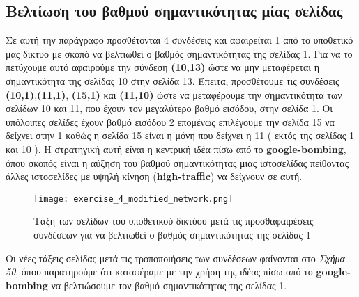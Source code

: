 \documentclass[First Project.tex]{subfiles}
\begin{document}
\subsection{ Βελτίωση του βαθμού σημαντικότητας μίας σελίδας }

Σε αυτή την παράγραφο προσθέτονται 4 συνδέσεις και αφαιρείται 1 από το υποθετικό μας δίκτυο με σκοπό να βελτιωθεί ο βαθμός σημαντικότητας της
σελίδας 1. Για να το πετύχουμε αυτό αφαιρούμε την σύνδεση \textbf{(10,13)} ώστε να μην μεταφέρεται
η σημαντικότητα της σελίδας 10 στην σελίδα 13. Έπειτα, προσθέτουμε τις συνδέσεις \textbf{(10,1)},\textbf{(11,1)},
\textbf{(15,1)} και \textbf{(11,10)} ώστε να μεταφέρουμε την σημαντικότητα των σελίδων 10 και 11, που έχουν 
τον μεγαλύτερο βαθμό εισόδου, στην σελίδα 1. Οι υπόλοιπες σελίδες έχουν βαθμό εισόδου 2 επομένως επιλέγουμε την σελίδα 15 να δείχνει στην 1
καθώς η σελίδα 15 είναι η μόνη που δείχνει η 11 ( εκτός της σελίδας 1 και 10 ). Η στρατηγική αυτή είναι η κεντρική ιδέα πίσω από το 
\textlatin{\textbf{google-bombing}}, όπου σκοπός είναι η αύξηση του βαθμού σημαντικότητας μιας ιστοσελίδας πείθοντας άλλες ιστοσελίδες με 
υψηλή κίνηση (\textlatin{\textbf{high-traffic}}) να δείχνουν σε αυτή.

\begin{figure}[h!]
    \centering
    \captionsetup{justification=centering}
    \begin{center}
        \texttt{[image: exercise\_4\_modified\_network.png]}    
        \caption{ Τάξη των σελίδων του υποθετικού δικτύου μετά τις προσθαφαιρέσεις συνδέσεων για να βελτιωθεί 
        ο βαθμός σημαντικότητας της σελίδας 1 }
    \end{center}
\end{figure} 

Οι νέες τάξεις σελίδας μετά τις τροποποιήσεις των συνδέσεων φαίνονται στο \textit{Σχήμα 50}, όπου παρατηρούμε ότι καταφέραμε με την χρήση της
ιδέας πίσω από το \textlatin{\textbf{google-bombing}} να βελτιώσουμε τον βαθμό σημαντικότητας της σελίδας 1.
\end{document}
